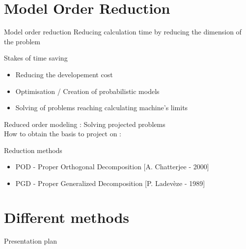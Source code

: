 \documentclass[10pt,a4paper]{beamer}
\begin{document}
\section{Model Order Reduction}

\begin{frame}{Model order reduction}
	Reducing calculation time by reducing the dimension of the problem
	\begin{block}{Stakes of time saving}
	{
	\begin{itemize}
	\item Reducing the developement cost
	\item Optimisation / Creation of probabilistic models
	\item Solving of problems reaching calculating machine's limits
	\end{itemize}
	}
	\end{block}
	
	Reduced order modeling : Solving projected problems\\
	How to obtain the basis to project on :
	\begin{block}{Reduction methods}
	{
	\begin{itemize}
	\item POD - Proper Orthogonal Decomposition [A. Chatterjee - 2000]
	\item PGD - Proper Generalized Decomposition [P. Ladevèze - 1989]
	\end{itemize}
	}
	\end{block}
	


\end{frame}


\section{Different methods}

\begin{frame}{Presentation plan}
\addtocounter{framenumber}{-1}
	\begin{block}{}
			\hspace{1cm}
			\begin{minipage}[l][0.650\textheight]{0.30\linewidth}
				\setcounter{tocdepth}{2}
				\tableofcontents[currentsection] 
			\end{minipage}
			\vspace{0.5cm}
	\end{block}
\end{frame}
\end{document}
